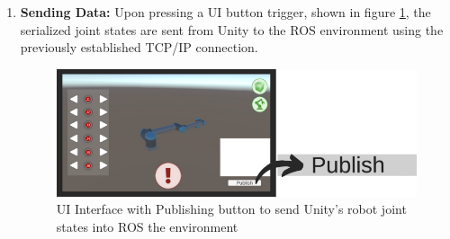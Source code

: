 \begin{enumerate}
        \item \textbf{Sending Data:} Upon pressing a UI button trigger, shown in figure \ref{fig:publish_UI_button}, the serialized joint states are sent from Unity to the ROS environment using the previously established TCP/IP connection.
            \begin{figure}[htpb]
                \centering
                \includegraphics[width=0.8\linewidth]{figs/UI_Publish.png}
                \caption{UI Interface with Publishing button to send Unity's robot joint states into ROS the environment}
                \label{fig:publish_UI_button}
            \end{figure}
        
    \end{enumerate}
    
